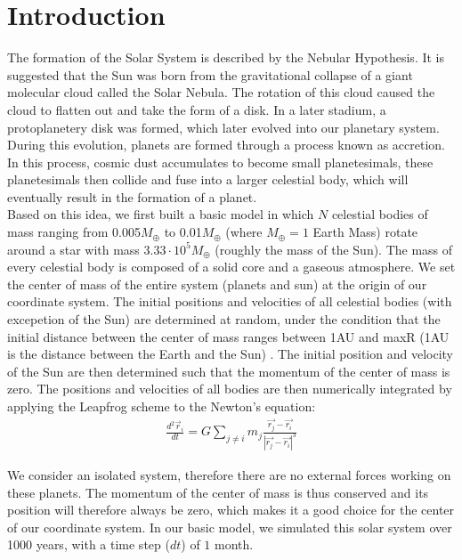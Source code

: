 \section{Introduction}
The formation of the Solar System is described by the Nebular Hypothesis. It is suggested that the Sun was born from the gravitational collapse of a giant molecular cloud called the Solar Nebula. 
The rotation of this cloud caused the cloud to flatten out and take the form of a disk. In a later stadium, a protoplanetery disk was formed, which later evolved into our planetary system.
During this evolution, planets are formed through a process known as accretion.
In this process, cosmic dust accumulates to become small planetesimals, these planetesimals then collide and fuse into a larger celestial body, which will eventually result in the formation of a planet.\\

Based on this idea, we first built a basic model in which \(N\) celestial bodies of mass ranging from 0.005$M_{\oplus}$ to 0.01$M_{\oplus}$ (where $M_{\oplus}=1$ Earth Mass)  rotate around a star with mass $3.33\cdot 10^5 M_{\oplus}$ (roughly the mass of the Sun).
The mass of every celestial body is composed of a solid core and a gaseous atmosphere.
We set the center of mass of the entire system (planets and sun) at the origin of our coordinate system. The initial positions and velocities of all celestial bodies (with excepetion of the Sun) are determined at random, under the condition that the initial distance between the center of mass ranges between 1AU and  maxR (1AU is the distance between the Earth and the Sun) . The initial position and velocity of the Sun are then determined such that the momentum of the center of mass is zero. The positions and velocities of all bodies are then numerically integrated by applying the Leapfrog scheme to the Newton's equation:
\begin{align}
\frac{d^2\vec{r}_i}{dt}=G\sum_{j\neq i}m_j\frac{\vec{r_j}-\vec{r_i}}{|\vec{r_j}-\vec{r_i}|^3}
\end{align}


We consider an isolated system, therefore there are no external forces working on these planets. The momentum of the center of mass is thus conserved and its position will therefore always be zero, which makes it a good choice for the center of our coordinate system. In our basic model, we simulated this solar system over 1000 years, with a time step (\(dt\)) of $1$ month.\\

